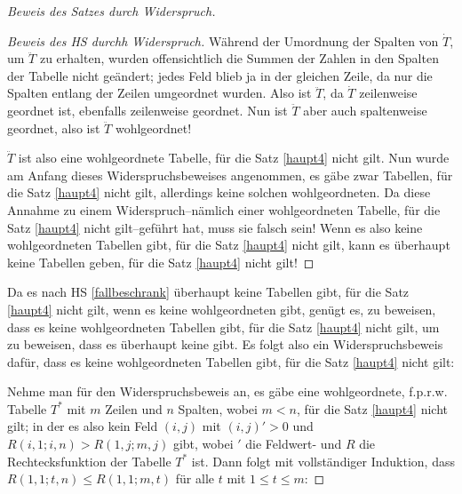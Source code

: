 \begin{proof}[Beweis des Satzes durch Widerspruch]
\begin{proof}[Beweis des HS durchh Widerspruch]
        Während der Umordnung der Spalten von $\dot T$, um $\ddot T$ zu erhalten, wurden offensichtlich die Summen der 
        Zahlen in den Spalten der Tabelle nicht geändert; jedes Feld blieb ja in der gleichen Zeile, da nur die 
        Spalten entlang der Zeilen umgeordnet wurden. Also ist $\ddot T$, da $\dot T$ zeilenweise geordnet ist, 
        ebenfalls zeilenweise geordnet. Nun ist $\ddot T$ aber auch spaltenweise geordnet, also ist $\ddot T$ 
        wohlgeordnet!

        $\ddot T$ ist also eine wohlgeordnete Tabelle, für die Satz \ref{haupt4} nicht gilt. Nun wurde am Anfang dieses 
        Widerspruchsbeweises angenommen, es gäbe zwar Tabellen, für die Satz \ref{haupt4} nicht gilt, allerdings keine 
        solchen wohlgeordneten. Da diese Annahme zu einem Widerspruch--nämlich einer wohlgeordneten Tabelle, für die 
        Satz \ref{haupt4} nicht gilt--geführt hat, muss sie falsch sein! Wenn es also keine wohlgeordneten Tabellen 
        gibt, für die Satz \eqref{haupt4} nicht gilt, kann es überhaupt keine Tabellen geben, für die Satz \ref{haupt4} 
        nicht gilt!
    \end{proof}
    Da es nach HS \ref{fallbeschrank} überhaupt keine Tabellen gibt, für die Satz \ref{haupt4} 
    nicht gilt, wenn es keine wohlgeordneten gibt, genügt es, zu beweisen, dass es keine wohlgeordneten Tabellen 
    gibt, für die Satz \ref{haupt4} nicht gilt, um zu beweisen, dass es überhaupt keine gibt. Es folgt also ein 
    Widerspruchsbeweis dafür, dass es keine wohlgeordneten Tabellen gibt, für die Satz \ref{haupt4} nicht gilt:

    Nehme man für den Widerspruchsbeweis an, es gäbe eine wohlgeordnete, f.p.r.w. Tabelle $T^*$ mit $m$ Zeilen und $n$ 
    Spalten, wobei $m<n$, für die Satz \ref{haupt4} nicht gilt; in der es also kein Feld $(i, j)$ mit $(i, j)'>0$ 
    und $R(i, 1; i, n)>R(1, j; m, j)$ gibt, wobei $'$ die Feldwert- und $R$ die Rechtecksfunktion der Tabelle $T^*$ 
    ist. Dann folgt mit vollständiger Induktion, dass $R(1, 1; t, n)\leq R(1, 1; m, t)$ für alle $t$ mit $1\leq 
    t\leq m$:


\end{proof}
